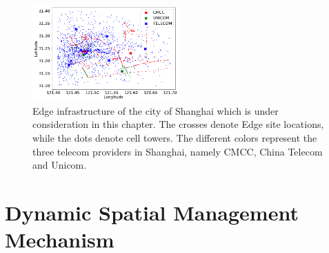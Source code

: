 \begin{figure}
\centering
\includegraphics[width=0.5\textwidth]{figures/mechanisms/infrastructure.png}
\caption{Edge infrastructure of the city of Shanghai which is under consideration in this chapter. The crosses denote Edge site locations, while the dots denote cell towers. The different colors represent the three telecom providers in Shanghai, namely CMCC, China Telecom and Unicom.}
\label{fig:shanghai_infra}
\end{figure}

\section{Dynamic Spatial Management Mechanism}
\label{sec:spatial_ctx_mgmt}

